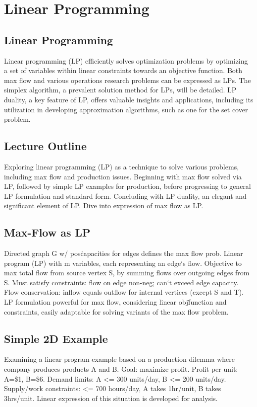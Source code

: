 \section*{Linear Programming}

\subsection*{Linear Programming}
Linear programming (LP) efficiently solves optimization problems by optimizing a set of variables within linear constraints towards an objective function.
Both max flow and various operations research problems can be expressed as LPs.
The simplex algorithm, a prevalent solution method for LPs, will be detailed.
LP duality, a key feature of LP, offers valuable insights and applications, including its utilization in developing approximation algorithms, such as one for the set cover problem.

\subsection*{Lecture Outline}
Exploring linear programming (LP) as a technique to solve various problems, including max flow and production issues.
Beginning with max flow solved via LP, followed by simple LP examples for production, before progressing to general LP formulation and standard form.
Concluding with LP duality, an elegant and significant element of LP\@.
Dive into expression of max flow as LP\@.

\subsection*{Max-Flow as LP}
Directed graph G w/ pos\. capacities for edges defines the max flow prob.
Linear program (LP) with m variables, each representing an edge`s flow.
Objective to max total flow from source vertex S, by summing flows over outgoing edges from S\@.
Must satisfy constraints: flow on edge non-neg; can`t exceed edge capacity.
Flow conservation: inflow equals outflow for internal vertices (except S and T).
LP formulation powerful for max flow, considering linear obj\. function and constraints, easily adaptable for solving variants of the max flow problem.

\subsection*{Simple 2D Example}
Examining a linear program example based on a production dilemma where company produces products A and B\@.
Goal: maximize profit.
Profit per unit: A=\$1, B=\$6.
Demand limits: A \textless{}= 300 units/day, B \textless{}= 200 units/day.
Supply/work constraints: \textless{}= 700 hours/day, A takes 1hr/unit, B takes 3hrs/unit.
Linear expression of this situation is developed for analysis.

